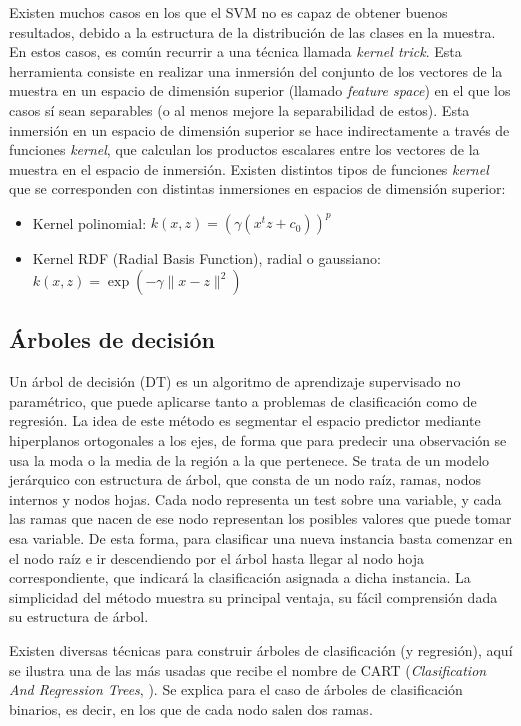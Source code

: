 \documentclass[12pt,a4paper,]{book}
\providecommand{\tightlist}{%
  \setlength{\itemsep}{0pt}\setlength{\parskip}{0pt}}
\numberwithin{dummy}{section}
\theoremstyle{ocrenumbox}
\theoremstyle{blacknumex}
\theoremstyle{blacknumbox}
\theoremstyle{ocrenum}
\theoremstyle{ocrenum}
\begin{document}
Existen muchos casos en los que el SVM no es capaz de obtener buenos
resultados, debido a la estructura de la distribución de las clases en
la muestra. En estos casos, es común recurrir a una técnica llamada
\emph{kernel trick}. Esta herramienta consiste en realizar una inmersión
del conjunto de los vectores de la muestra en un espacio de dimensión
superior (llamado \emph{feature space}) en el que los casos sí sean
separables (o al menos mejore la separabilidad de estos). Esta inmersión
en un espacio de dimensión superior se hace indirectamente a través de
funciones \emph{kernel}, que calculan los productos escalares entre los
vectores de la muestra en el espacio de inmersión. Existen distintos
tipos de funciones \emph{kernel} que se corresponden con distintas
inmersiones en espacios de dimensión superior:

\begin{itemize}
\tightlist
\item
  Kernel polinomial: \(k(x,z) = \left( \gamma(x^tz + c_0) \right)^p\)
\item
  Kernel RDF (Radial Basis Function), radial o gaussiano:
  \(k(x,z) = \exp(-\gamma \| x-z\|^2)\)
\end{itemize}

\hypertarget{uxe1rboles-de-decisiuxf3n}{%
\subsection{Árboles de decisión}\label{uxe1rboles-de-decisiuxf3n}}

Un árbol de decisión (DT) es un algoritmo de aprendizaje supervisado no
paramétrico, que puede aplicarse tanto a problemas de clasificación como
de regresión. La idea de este método es segmentar el espacio predictor
mediante hiperplanos ortogonales a los ejes, de forma que para predecir
una observación se usa la moda o la media de la región a la que
pertenece. Se trata de un modelo jerárquico con estructura de árbol, que
consta de un nodo raíz, ramas, nodos internos y nodos hojas. Cada nodo
representa un test sobre una variable, y cada las ramas que nacen de ese
nodo representan los posibles valores que puede tomar esa variable. De
esta forma, para clasificar una nueva instancia basta comenzar en el
nodo raíz e ir descendiendo por el árbol hasta llegar al nodo hoja
correspondiente, que indicará la clasificación asignada a dicha
instancia. La simplicidad del método muestra su principal ventaja, su
fácil comprensión dada su estructura de árbol.

Existen diversas técnicas para construir árboles de clasificación (y
regresión), aquí se ilustra una de las más usadas que recibe el nombre
de CART (\emph{Clasification And Regression Trees},
\citet{breiman1984classification}). Se explica para el caso de árboles
de clasificación binarios, es decir, en los que de cada nodo salen dos
ramas.
\end{document}

